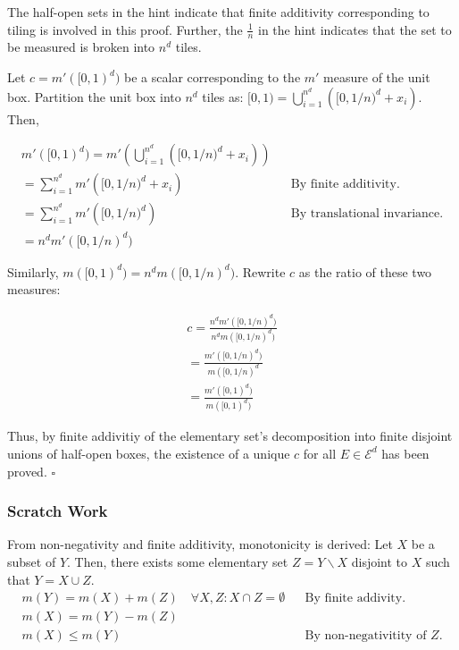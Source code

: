 \documentclass[12pt,letterpaper]{article}
\begin{document}
The half-open sets in the hint indicate that finite additivity corresponding to tiling is involved in this proof.
Further, the $\frac{1}{n}$ in the hint indicates that the set to be measured is broken into $n^d$ tiles.

Let $c = m'([0,1)^d)$ be a scalar corresponding to the $m'$ measure of the unit box.
Partition the unit box into $n^d$ tiles as: $[0,1) = \bigcup_{i=1}^{n^d} \left( [0,1/n)^d + x_i \right)$.
Then,

\begin{equation}
   \begin{aligned}
      m'([0,1)^d) = m'\left(\bigcup_{i=1}^{n^d} \left( [0,1/n)^d + x_i \right)\right) \\
      = \sum_{i=1}^{n^d} m'\left([0,1/n)^d + x_i \right) && \text{By finite additivity.} \\
      = \sum_{i=1}^{n^d} m'\left([0,1/n)^d \right) && \text{By translational invariance.} \\
      = n^d m'([0,1/n)^d)
   \end{aligned}
\end{equation}

Similarly, $m([0,1)^d) = n^d m([0,1/n)^d)$.
Rewrite $c$ as the ratio of these two measures:

\begin{equation}
   \begin{aligned}
      c = \frac{n^d m'([0,1/n)^d)}{n^d m([0,1/n)^d)} \\
      = \frac{m'([0,1/n)^d)}{m([0,1/n)^d} \\
      = \frac{m'([0,1)^d)}{m([0,1)^d)}
   \end{aligned}
\end{equation}

Thus, by finite addivitiy of the elementary set's decomposition into finite disjoint unions of half-open boxes,
the existence of a unique $c$ for all $E \in \mathcal{E}^d$ has been proved. $\square$

\subsubsection{Scratch Work}
From non-negativity and finite additivity, monotonicity is derived: 
Let $X$ be a subset of $Y$.  Then, there exists some elementary set $Z = Y \backslash X$ disjoint to $X$ such that $Y = X \cup Z$.
\begin{equation}
   \begin{aligned}
      m(Y) = m(X) + m(Z) \quad \forall X,Z : X \cap Z = \emptyset && \text{By finite addivity.} \\
      m(X) = m(Y) - m(Z) \\
      m(X) \le m(Y) && \text{By non-negativitity of $Z$.}
   \end{aligned}
\end{equation}
\end{document}
